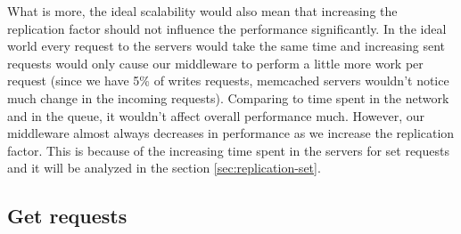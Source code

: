 \documentclass[11pt]{article}
\begin{document}
What is more, the ideal scalability would also mean that increasing the replication factor should not influence the performance significantly. In the ideal world every request to the servers would take the same time and increasing sent requests would only cause our middleware to perform a little more work per request (since we have 5\% of writes requests, memcached servers wouldn't notice much change in the incoming requests). Comparing to time spent in the network and in the queue, it wouldn't affect overall performance much. However, our middleware almost always decreases in performance as we increase the replication factor. This is because of the increasing time spent in the servers for set requests and it will be analyzed in the section \ref{sec:replication-set}.

\subsection{Get requests}
\label{sec:replication-get}
\end{document}
